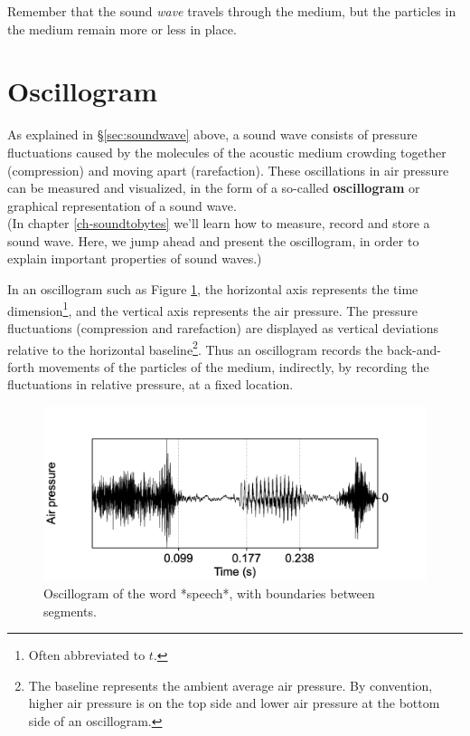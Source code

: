 \documentclass[
]{book}
\begin{document}
Remember that the sound \emph{wave} travels through the medium, but the particles in the medium remain more or less in place.

\section{Oscillogram}\label{sec:oscillogram}

As explained in §\ref{sec:soundwave} above, a sound wave consists of pressure fluctuations caused by the molecules of the acoustic medium crowding together (compression) and moving apart (rarefaction). These oscillations in air pressure can be measured and visualized, in the form of a so-called \textbf{oscillogram} or graphical representation of a sound wave.\\
(In chapter \ref{ch-soundtobytes} we'll learn how to measure, record and store a sound wave. Here, we jump ahead and present the oscillogram, in order to explain important properties of sound waves.)

In an oscillogram such as Figure \ref{fig:speech-oscillogram}, the horizontal axis represents the time dimension\footnote{Often abbreviated to \(t\).}, and the vertical axis represents the air pressure. The pressure fluctuations (compression and rarefaction) are displayed as vertical deviations relative to the horizontal baseline\footnote{The baseline represents the ambient average air pressure. By convention, higher air pressure is on the top side and lower air pressure at the bottom side of an oscillogram.}.
Thus an oscillogram records the back-and-forth movements of the particles of the medium, indirectly, by recording the fluctuations in relative pressure, at a fixed location.

\begin{figure}

{\centering \includegraphics{figures/speech_word_oscillogram} 

}

\caption{Oscillogram of the word *speech*, with boundaries between segments.}\label{fig:speech-oscillogram}
\end{figure}
\end{document}
